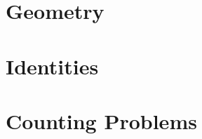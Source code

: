 \documentclass[10pt, twocolumn]{article}
\begin{document}
\section{Geometry}








\section{Identities}

\section{Counting Problems}

\end{document}
